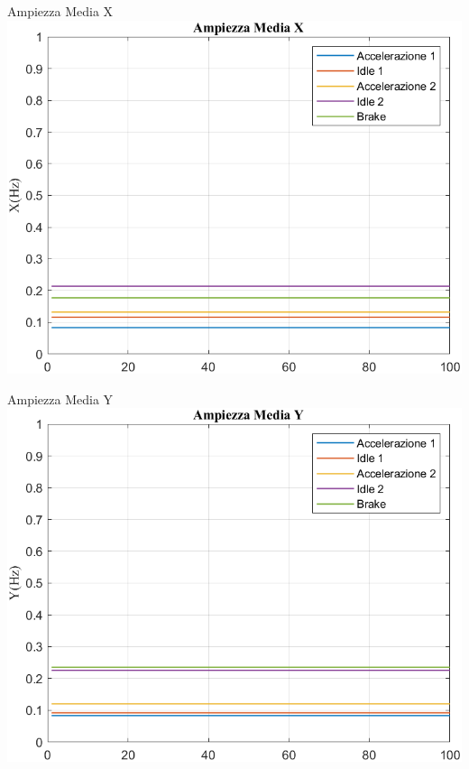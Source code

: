\documentclass[beamer]{standalone}
\begin{document}
	\begin{frame}{{Ampiezza Media X}}
		\centering\includegraphics[height=.8\textheight]{figure/Mag/Trasformata/Ampiezza MediaX}
	\end{frame}
	
	\begin{frame}{{Ampiezza Media Y}}
		\centering\includegraphics[height=.8\textheight]{figure/Mag/Trasformata/Ampiezza MediaY}
	\end{frame}
	
\end{document}
